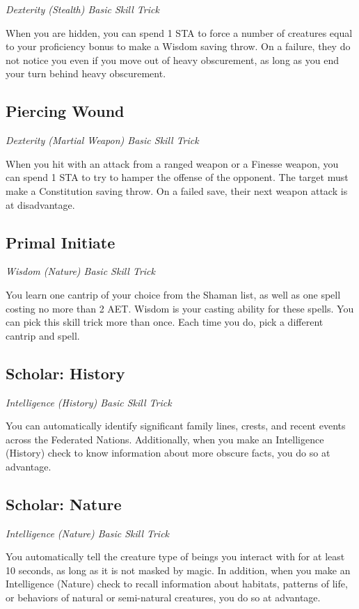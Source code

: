 \textit{Dexterity (Stealth) Basic Skill Trick}

When you are hidden, you can spend 1 STA to force a number of creatures equal to your proficiency bonus to make a Wisdom saving throw. On a failure, they do not notice you even if you move out of heavy obscurement, as long as you end your turn behind heavy obscurement.

\subsection{Piercing Wound}

\textit{Dexterity (Martial Weapon) Basic Skill Trick}

When you hit with an attack from a ranged weapon or a Finesse weapon, you can spend 1 STA to try to hamper the offense of the opponent. The target must make a Constitution saving throw. On a failed save, their next weapon attack is at disadvantage.

\subsection{Primal Initiate}

\textit{Wisdom (Nature) Basic Skill Trick}

You learn one cantrip of your choice from the Shaman list, as well as one spell costing no more than 2 AET. Wisdom is your casting ability for these spells. You can pick this skill trick more than once. Each time you do, pick a different cantrip and spell.

\subsection{Scholar: History}\label{st:scholar-history}

\textit{Intelligence (History) Basic Skill Trick}

You can automatically identify significant family lines, crests, and recent events across the Federated Nations. Additionally, when you make an Intelligence (History) check to know information about more obscure facts, you do so at advantage.

\subsection{Scholar: Nature}

\textit{Intelligence (Nature) Basic Skill Trick}

You automatically tell the creature type of beings you interact with for at least 10 seconds, as long as it is not masked by magic. In addition, when you make an Intelligence (Nature) check to recall information about habitats, patterns of life, or behaviors of natural or semi-natural creatures, you do so at advantage.

